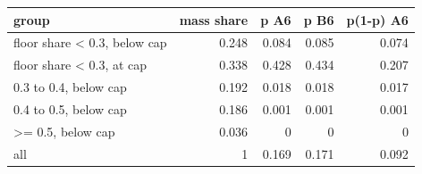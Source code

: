 \begin{tabular}{lrrrr}
\toprule
group & mass share & p A6 & p B6 & p(1-p) A6 \\
\midrule
floor share < 0.3, below cap & 0.248 & 0.084 & 0.085 & 0.074 \\
floor share < 0.3, at cap & 0.338 & 0.428 & 0.434 & 0.207 \\
0.3 to 0.4, below cap & 0.192 & 0.018 & 0.018 & 0.017 \\
0.4 to 0.5, below cap & 0.186 & 0.001 & 0.001 & 0.001 \\
>= 0.5, below cap & 0.036 & 0 & 0 & 0 \\
all & 1 & 0.169 & 0.171 & 0.092 \\
\bottomrule
\end{tabular}

